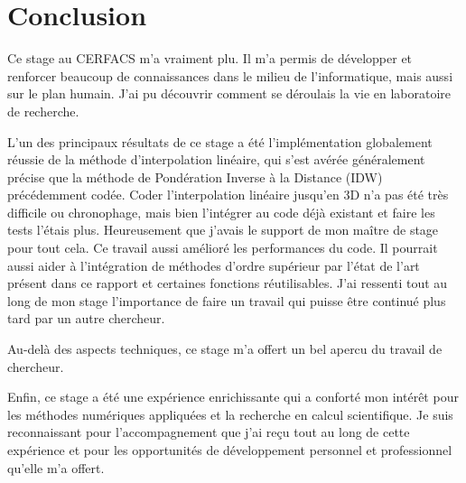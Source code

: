 \chapter*{Conclusion}


Ce stage au CERFACS m'a vraiment plu. Il m'a permis de développer et renforcer beaucoup de connaissances dans le milieu de l'informatique, mais aussi sur le plan humain. J'ai pu découvrir comment se déroulais la vie en laboratoire de recherche.

L'un des principaux résultats de ce stage a été l'implémentation globalement réussie de la méthode d'interpolation linéaire, qui s'est avérée généralement précise que la méthode de Pondération Inverse à la Distance (IDW) précédemment codée.
Coder l'interpolation linéaire jusqu'en 3D n'a pas été très difficile ou chronophage, mais bien l'intégrer au code déjà existant et faire les tests l'étais plus. Heureusement que j'avais le support de mon maître de stage pour tout cela.
Ce travail aussi amélioré les performances du code.
Il pourrait aussi aider à l'intégration de méthodes d'ordre supérieur par l'état de l'art présent dans ce rapport et certaines fonctions réutilisables.
J'ai ressenti tout au long de mon stage l'importance de faire un travail qui puisse être continué plus tard par un autre chercheur.

Au-delà des aspects techniques, ce stage m'a offert un bel apercu du travail de chercheur.

Enfin, ce stage a été une expérience enrichissante qui a conforté mon intérêt pour les méthodes numériques appliquées et la recherche en calcul scientifique. Je suis reconnaissant pour l'accompagnement que j'ai reçu tout au long de cette expérience et pour les opportunités de développement personnel et professionnel qu'elle m'a offert.
